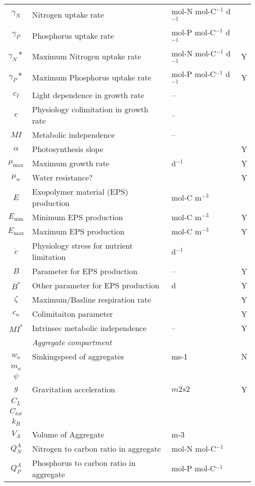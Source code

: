 \documentclass[fleqn]{article}                     %
\begin{document}
\begin{table*}[h]
\begin{tabular}{clll}
    $\gamma_N$ & Nitrogen uptake rate & mol-N mol-C$^{-1}$ d$^{-1}$ \\
    $\gamma_P$ & Phosphorus uptake rate & mol-P mol-C$^{-1}$ d$^{-1}$ \\
    $\gamma_N*$ & Maximum Nitrogen uptake rate & mol-N mol-C$^{-1}$ d$^{-1}$&Y \\
    $\gamma_P*$ & Maximum Phosphorus uptake rate & mol-P mol-C$^{-1}$ d$^{-1}$&Y \\
    $c_I$ & Light dependence in growth rate & -- \\
    $c$ & Physiology colimitation in growth rate & -- \\
    $MI$ & Metabolic independence & -- \\
    $\alpha$ & Photosynthesis slope & &Y \\
    $\mu_{\textrm{max}}$ & Maximum growth rate & d$^{-1}$ &Y\\
    $\mu_w$&Water resistance?&&Y\\
    $E$ & Exopolymer material (EPS) production & mol-C m$^{-3}$ \\
    $E_{\textrm{min}}$ & Minimum EPS production & mol-C m$^{-3}$&Y \\
    $E_{\textrm{max}}$ & Maximum EPS production & mol-C m$^{-3}$ &Y\\
    $\dot{c}$ & Physiology stress for nutrient limitation & d$^{-1}$ \\
    $B$ & Parameter for EPS production & --&Y \\
    $B^*$ & Other parameter for EPS production & d &Y\\
    $\zeta$ & Maximum/Basline respiration rate &&Y\\
    $c_n$&Colimitaiton parameter&&Y\\
    $MI^*$ & Intrinsec metabolic independence & --&Y \\ \hline
    & \emph{Aggregate compartment} & \\
    $w_a$&Sinkingspeed of aggregates&ms-1&N\\
    $m_a$\\
    $\psi$ &&\\
    $g$&Gravitation acceleration&$m2s2$&Y\\
    $C_L$ &&\\
    $C_{tot}$&\\
    $k_B$&&\\
    $V_A$ & Volume of Aggregate & m-3 \\
    $Q^A_N$ & Nitrogen to carbon ratio in aggregate & mol-N mol-C$^{-1}$ \\
    $Q^A_P$ & Phosphorus to carbon ratio in aggregate & mol-P mol-C$^{-1}$ \\
    \hline

  \end{tabular}
\end{table*}
\end{document}
